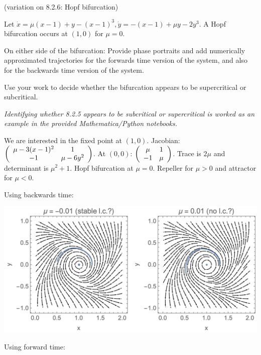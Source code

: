 \documentclass[12pt,letterpaper,answers]{exam}
\begin{document}
\begin{questions}

\question (variation on 8.2.6: Hopf bifurcation) 

Let $\dot x = \mu (x - 1) + y - (x-1)^3, \dot y = -(x-1) + \mu y - 2 y^3$.  A Hopf bifurcation occurs at $(1,0)$ for $\mu = 0$. 

On either side of the bifurcation: Provide phase portraits and add numerically approximated trajectories for the forwards time version of the system, and also for the backwards time version of the system.

Use your work to decide whether the bifurcation appears to be supercritical or subcritical.  

\emph{Identifying whether 8.2.5 appears to be subcritical or supercritical is worked as an example in the provided Mathematica/Python notebooks.}

\unframedsolutions

\begin{solution}

We are interested in the fixed point at $(1,0)$.  Jacobian: $\left(\begin{array}{c c} \mu -3(x-1)^2 & 1 \\ -1 & \mu - 6y^2\end{array}\right)$.  At $(0,0)$: $\left(\begin{array}{c c} \mu  & 1 \\ -1 & \mu \end{array}\right)$.  Trace is $2\mu$ and determinant is $\mu^2 + 1$.  Hopf bifurcation at $\mu = 0$.  Repeller for $\mu > 0$ and attractor for $\mu < 0$.

Using backwards time:

\includegraphics[width=\textwidth]{img/PS08-S23-q1.png}


Using forward time:


\end{solution}
\end{questions}
\end{document}
